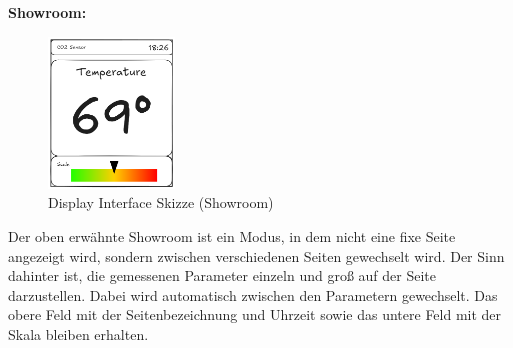 \begin{inhalt}
\clearpage


\begin{center}
    \textbf{Showroom:}
\end{center}

\begin{figure}[!htb]
\centering
\includegraphics[width=0.3\textwidth]{files/Tobias/pics/Skizzen/Showroom1.png}
\caption[Display Interface Skizze (Showroom)]{Display Interface Skizze (Showroom)}
\label{fig:display_skizze_showroom1}
\end{figure}

Der oben erwähnte Showroom ist ein Modus, in dem nicht eine fixe Seite angezeigt wird, sondern zwischen verschiedenen Seiten gewechselt wird. Der Sinn dahinter ist, die gemessenen Parameter einzeln und groß auf der Seite darzustellen. Dabei wird automatisch zwischen den Parametern gewechselt. Das obere Feld mit der Seitenbezeichnung und Uhrzeit sowie das untere Feld mit der Skala bleiben erhalten.

\end{inhalt}